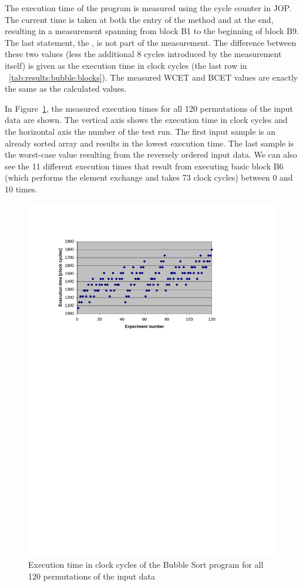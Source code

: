 The execution time of the program is measured using the cycle
counter in JOP. The current time is taken at both the entry of the
method and at the end, resulting in a measurement spanning from
block B1 to the beginning of block B9. The last statement, the
, is not part of the measurement. The difference
between these two values (less the additional 8 cycles introduced by
the measurement itself) is given as the execution time in clock
cycles (the last row in \tablename~\ref{tab:results:bubble:blocks}).
The measured WCET and BCET values are exactly the same as the
calculated values.


In Figure~\ref{fig:results:wcet:sort}, the measured execution times
for all 120 permutations of the input data are shown. The vertical
axis shows the execution time in clock cycles and the horizontal
axis the number of the test run. The first input sample is an
already sorted array and results in the lowest execution time. The
last sample is the worst-case value resulting from the reversely
ordered input data. We can also see the 11 different execution times
that result from executing basic block B6 (which performs the
element exchange and takes 73 clock cycles) between 0 and 10 times.

\begin{figure}
    \centering
    \includegraphics[width=\excelwidth]{results/results_wcet_sort}
    \caption{Execution time in clock cycles of the Bubble Sort program
    for all 120 permutations of the input data}
    \label{fig:results:wcet:sort}
\end{figure}




